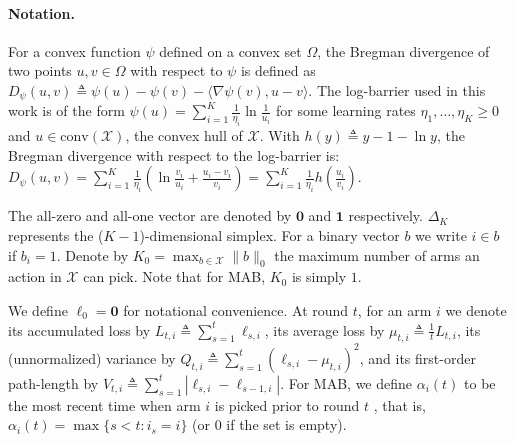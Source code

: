 \documentclass[final, 12pt]{colt2018} %
\newcommand{\inn}[1]{ \langle {#1} \rangle }
\newcommand{\absolute}[1]{ \left\lvert {#1} \right\rvert }
\begin{document}
\paragraph{Notation.}
For a convex function $\psi$ defined on a convex set $\Omega$, the Bregman divergence of two points $u, v\in \Omega$ with respect to $\psi$ is defined as $D_{\psi}(u,v)\triangleq\psi(u)-\psi(v)-\inn{\nabla\psi(v), u-v}$. The log-barrier used in this work is of the form $\psi(u)=\sum_{i=1}^K \frac{1}{\eta_i}\ln \frac{1}{u_i}$ for some learning rates $\eta_1, \ldots, \eta_K \geq 0$ and $u \in \text{conv}(\mathcal{X})$, the convex hull of $\mathcal{X}$. With $h(y)\triangleq y-1-\ln y$, the Bregman divergence with respect to the log-barrier is: 
$D_{\psi}(u,v)=\sum_{i=1}^K \frac{1}{\eta_i} \left(\ln \frac{v_i}{u_i} + \frac{u_i-v_i}{v_i}\right)=\sum_{i=1}^K \frac{1}{\eta_i} h\left(\frac{u_i}{v_i}\right).$


The all-zero and all-one vector are denoted by $\mathbf{0}$ and $\mathbf{1}$ respectively.
$\Delta_K$ represents the ($K-1$)-dimensional simplex.
For a binary vector $b$ we write $i\in b$ if $b_i=1$. 
Denote by $K_0 = \max_{b \in \mathcal{X}}\|b\|_0$ the maximum number of arms an action in $\mathcal{X}$ can pick.
Note that for MAB, $K_0$ is simply $1$.

We define $\ell_0 = \mathbf{0}$ for notational convenience. 
At round $t$, for an arm $i$ we denote its accumulated loss by $L_{t,i}\triangleq \sum_{s=1}^t \ell_{s,i}$,
its average loss by $\mu_{t,i} \triangleq \frac{1}{t}L_{t,i}$,
its (unnormalized) variance by $Q_{t,i}\triangleq \sum_{s=1}^t (\ell_{s,i}-\mu_{t,i})^2$,
and its first-order path-length by $V_{t,i}\triangleq \sum_{s=1}^t \absolute{\ell_{s,i}-\ell_{s-1,i}}$. 
For MAB, we define $\alpha_i(t)$ to be the most recent time when arm $i$ is picked prior to round $t$ ,
that is, $\alpha_i(t) = \max\{s < t : i_s = i\}$ (or $0$ if the set is empty).
\end{document}
